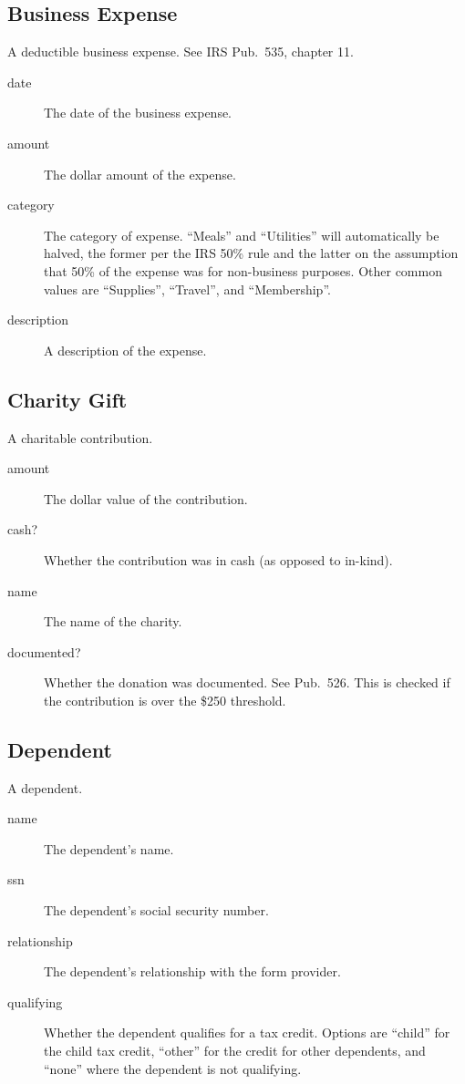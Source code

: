 \documentclass[12pt]{article}
\begin{document}
\subsection{Business Expense}

A deductible business expense. See IRS Pub.~535, chapter 11.

\begin{description}
\item[date] The date of the business expense.
\item[amount] The dollar amount of the expense.
\item[category] The category of expense. ``Meals'' and ``Utilities'' will
automatically be halved, the former per the IRS 50\% rule and the latter on the
assumption that 50\% of the expense was for non-business purposes. Other common
values are ``Supplies'', ``Travel'', and ``Membership''.
\item[description] A description of the expense.
\end{description}


\subsection{Charity Gift}

A charitable contribution.

\begin{description}
\item[amount] The dollar value of the contribution.
\item[cash?] Whether the contribution was in cash (as opposed to in-kind).
\item[name] The name of the charity.
\item[documented?] Whether the donation was documented. See Pub.\ 526. This is
checked if the contribution is over the \$250 threshold.
\end{description}



\subsection{Dependent}

A dependent.

\begin{description}
\item[name] The dependent's name.
\item[ssn] The dependent's social security number.
\item[relationship] The dependent's relationship with the form provider.
\item[qualifying] Whether the dependent qualifies for a tax credit. Options are
``child'' for the child tax credit, ``other'' for the credit for other
dependents, and ``none'' where the dependent is not qualifying.
\end{description}
\end{document}
